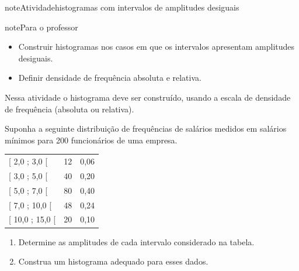 \begin{sphinxadmonition}{note}{Atividade}{histogramas com intervalos de amplitudes desiguais}

\begin{sphinxadmonition}{note}{Para o professor}

\begin{itemize}
\item {} 
Construir histogramas nos casos em que os intervalos apresentam amplitudes desiguais.

\item {} 
Definir densidade de frequência absoluta e relativa.

\end{itemize}


Nessa atividade o histograma deve ser construído, usando a escala de densidade de frequência (absoluta ou relativa).
\end{sphinxadmonition}

Suponha a seguinte distribuição de frequências de salários medidos em salários mínimos para 200 funcionários de uma empresa.


\begin{savenotes}\sphinxattablestart
\centering
\begin{tabulary}{\linewidth}[t]{|T|T|T|}
\hline
{}\relax &\relax &\relax \\
\hline
{[} 2,0 ; 3,0 {[}
&
12
&
0,06
\\
\hline
{[} 3,0 ; 5,0 {[}
&
40
&
0,20
\\
\hline
{[} 5,0 ; 7,0 {[}
&
80
&
0,40
\\
\hline
{[} 7,0 ; 10,0 {[}
&
48
&
0,24
\\
\hline
{[} 10,0 ; 15,0 {[}
&
20
&
0,10
\\
\hline
\end{tabulary}
\par
\sphinxattableend\end{savenotes}
\begin{enumerate}
\item {} 
Determine as amplitudes de cada intervalo considerado na tabela.

\item {} 
Construa um histograma adequado para esses dados.

\end{enumerate}
\end{sphinxadmonition}


